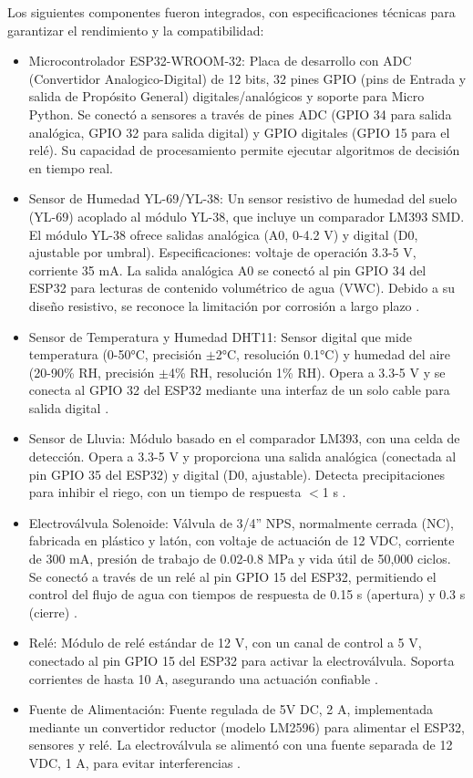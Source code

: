 \documentclass[pdflatex,sn-mathphys-num]{sn-jnl}%
\theoremstyle{thmstyleone}%
\theoremstyle{thmstyletwo}%
\theoremstyle{thmstylethree}%
\begin{document}
\begin{multicols}{2}
Los siguientes componentes fueron integrados, con especificaciones técnicas para garantizar el rendimiento y la compatibilidad:
\begin{itemize}
  \item Microcontrolador ESP32-WROOM-32: Placa de desarrollo con ADC (Convertidor Analogico-Digital) de 12 bits, 32 pines GPIO (pins de Entrada y salida de Propósito General) digitales/analógicos y soporte para Micro Python. Se conectó a sensores a través de pines ADC (GPIO 34 para salida analógica, GPIO 32 para salida digital) y GPIO digitales (GPIO 15 para el relé). Su capacidad de procesamiento permite ejecutar algoritmos de decisión en tiempo real\cite{ref5}.
  \item Sensor de Humedad YL-69/YL-38: Un sensor resistivo de humedad del suelo (YL-69) acoplado al módulo YL-38, que incluye un comparador LM393 SMD. El módulo YL-38 ofrece salidas analógica (A0, 0-4.2 V) y digital (D0, ajustable por umbral). Especificaciones: voltaje de operación 3.3-5 V, corriente 35 mA. La salida analógica A0 se conectó al pin GPIO 34 del ESP32 para lecturas de contenido volumétrico de agua (VWC). Debido a su diseño resistivo, se reconoce la limitación por corrosión a largo plazo \cite{ref6}.
  \item Sensor de Temperatura y Humedad DHT11: Sensor digital que mide temperatura (0-50°C, precisión $\pm$2°C, resolución 0.1°C) y humedad del aire (20-90\% RH, precisión $\pm$4\% RH, resolución 1\% RH). Opera a 3.3-5 V y se conecta al GPIO 32 del ESP32 mediante una interfaz de un solo cable para salida digital \cite{ref7}. 
  \item Sensor de Lluvia: Módulo basado en el comparador LM393, con una celda de detección. Opera a 3.3-5 V y proporciona una salida analógica (conectada al pin GPIO 35 del ESP32) y digital (D0, ajustable). Detecta precipitaciones para inhibir el riego, con un tiempo de respuesta $<$1 s \cite{ref8}.
  \item Electroválvula Solenoide: Válvula de 3/4'' NPS, normalmente cerrada (NC), fabricada en plástico y latón, con voltaje de actuación de 12 VDC, corriente de 300 mA, presión de trabajo de 0.02-0.8 MPa y vida útil de 50,000 ciclos. Se conectó a través de un relé al pin GPIO 15 del ESP32, permitiendo el control del flujo de agua con tiempos de respuesta de 0.15 s (apertura) y 0.3 s (cierre) \cite{ref9}.
  \item Relé: Módulo de relé estándar de 12 V, con un canal de control a 5 V, conectado al pin GPIO 15 del ESP32 para activar la electroválvula. Soporta corrientes de hasta 10 A, asegurando una actuación confiable \cite{ref10}.
  \item Fuente de Alimentación: Fuente regulada de 5V DC, 2 A, implementada mediante un convertidor reductor (modelo LM2596) para alimentar el ESP32, sensores y relé. La electroválvula se alimentó con una fuente separada de 12 VDC, 1 A, para evitar interferencias \cite{ref11}.
\end{itemize}


\end{multicols}
\end{document}
